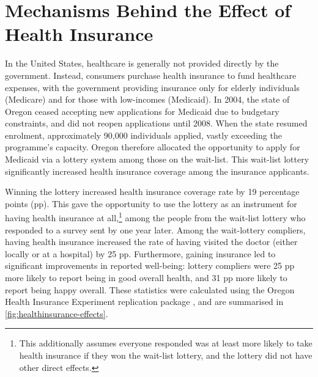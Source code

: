 \section{Mechanisms Behind the Effect of Health Insurance}
\label{sec:healthinsurance}

In the United States, healthcare is generally not provided directly by the government.
Instead, consumers purchase health insurance to fund healthcare expenses, with the government providing insurance only for elderly individuals (Medicare) and for those with low-incomes (Medicaid).
In 2004, the state of Oregon ceased accepting new applications for Medicaid due to budgetary constraints, and did not reopen applications until 2008.
When the state resumed enrolment, approximately 90,000 individuals applied, vastly exceeding the programme's capacity.
Oregon therefore allocated the opportunity to apply for Medicaid via a lottery system among those on the wait-list.
This wait-list lottery significantly increased health insurance coverage among the insurance applicants.

Winning the lottery increased health insurance coverage rate by 19 percentage points (pp).
This gave the opportunity to use the lottery as an instrument for having health insurance at all,\footnote{
    This additionally assumes everyone responded was at least more likely to take health insurance if they won the wait-list lottery, and the lottery did not have other direct effects.
} among the  people from the wait-list lottery who responded to a survey sent by \cite{finkelstein2008oregon} one year later.
Among the wait-lottery compliers, having health insurance increased the rate of having visited the doctor (either locally or at a hospital) by 25 pp.
Furthermore, gaining insurance led to significant improvements in reported well-being: lottery compliers were 25 pp more likely to report being in good overall health, and 31 pp more likely to report being happy overall.
These statistics were calculated using the Oregon Health Insurance Experiment replication package \citep{icspr2014oregon}, and are summarised in \autoref{fig:healthinsurance-effects}.

